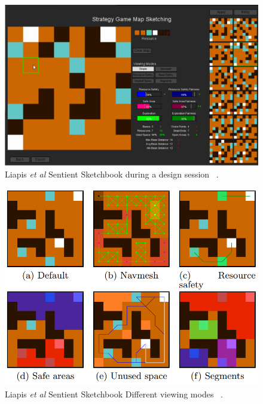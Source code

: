 \documentclass[journal]{IEEEtran}
\begin{document}
\begin{figure}[h]
	\includegraphics[width=1.0\linewidth]{SentientSketchbook.PNG}
	\caption{Liapis \textit{et al} Sentient Sketchbook during a design session ~\cite{liapis2013sentient}.}
	\label{Sketchbook}
\end{figure} 

\begin{figure}[h]
	\includegraphics[width=1.0\linewidth]{SentientSketchbook2.PNG}
	\caption{Liapis \textit{et al} Sentient Sketchbook Different viewing modes ~\cite{liapis2013sentient}.}
	\label{Sketchbook2}
\end{figure} 
\end{document}
